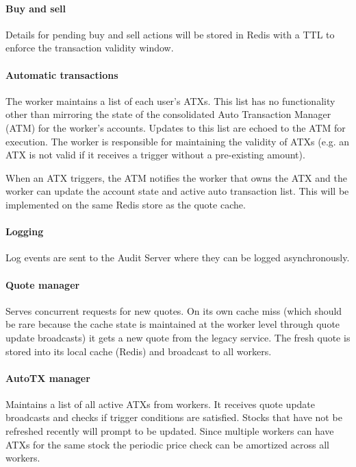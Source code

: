 \paragraph{Buy and sell}
Details for pending buy and sell actions will be stored in Redis with a TTL to enforce the transaction validity window.

\paragraph{Automatic transactions}
The worker maintains a list of each user's ATXs.
This list has no functionality other than mirroring the state of the consolidated Auto Transaction Manager (ATM) for the worker's accounts.
Updates to this list are echoed to the ATM for execution.
The worker is responsible for maintaining the validity of ATXs (e.g. an ATX is not valid if it receives a trigger without a pre-existing amount).

When an ATX triggers, the ATM notifies the worker that owns the ATX and the worker can update the account state and active auto transaction list.
This will be implemented on the same Redis store as the quote cache.

\paragraph{Logging}
Log events are sent to the Audit Server where they can be logged asynchronously.

\paragraph{Quote manager}
Serves concurrent requests for new quotes.
On its own cache miss (which should be rare because the cache state is maintained at the worker level through quote update broadcasts) it gets a new quote from the legacy service.
The fresh quote is stored into its local cache (Redis) and broadcast to all workers.

\paragraph{AutoTX manager}
Maintains a list of all active ATXs from workers.
It receives quote update broadcasts and checks if trigger conditions are satisfied.
Stocks that have not be refreshed recently will prompt to be updated.
Since multiple workers can have ATXs for the same stock the periodic price check can be amortized across all workers.

